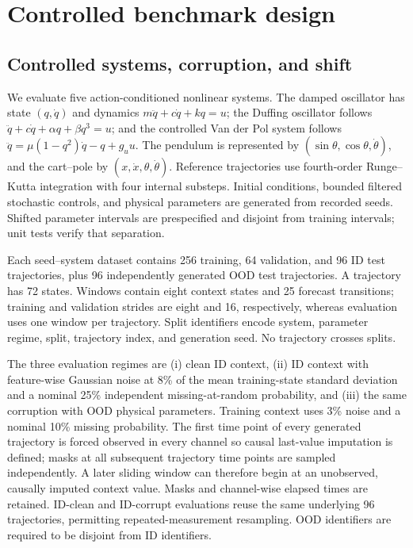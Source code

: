 \section{Controlled benchmark design}

\subsection{Controlled systems, corruption, and shift}

We evaluate five action-conditioned nonlinear systems. The damped oscillator
has state $(q,\dot q)$ and dynamics $m\ddot q+c\dot q+kq=u$; the Duffing
oscillator follows $\ddot q+c\dot q+\alpha q+\beta q^3=u$; and the controlled
Van der Pol system follows
$\ddot q=\mu(1-q^2)\dot q-q+g_u u$. The pendulum is represented by
$(\sin\theta,\cos\theta,\dot\theta)$, and the cart--pole by
$(x,\dot x,\theta,\dot\theta)$. Reference trajectories use fourth-order
Runge--Kutta integration with four internal substeps. Initial conditions,
bounded filtered stochastic controls, and physical parameters are generated
from recorded seeds. Shifted parameter intervals are prespecified and disjoint
from training intervals; unit tests verify that separation.

Each seed--system dataset contains 256 training, 64 validation, and 96 ID test
trajectories, plus 96 independently generated OOD test trajectories. A
trajectory has 72 states. Windows contain eight context states and 25 forecast
transitions; training and validation strides are eight and 16, respectively,
whereas evaluation uses one window per trajectory. Split identifiers encode
system, parameter regime, split, trajectory index, and generation seed. No
trajectory crosses splits.

The three evaluation regimes are (i) clean ID context, (ii) ID context with
feature-wise Gaussian noise at 8\% of the mean training-state standard
deviation and a nominal 25\% independent missing-at-random probability, and
(iii) the same corruption with OOD physical parameters. Training context uses
3\% noise and a nominal 10\% missing probability. The first time point of every
generated trajectory is forced observed in every channel so causal last-value
imputation is defined; masks at all subsequent trajectory time points are
sampled independently. A later sliding window can therefore begin at an
unobserved, causally imputed context value. Masks and channel-wise elapsed times
are retained. ID-clean and ID-corrupt evaluations reuse the same underlying 96
trajectories, permitting repeated-measurement resampling. OOD identifiers are
required to be disjoint from ID identifiers.

